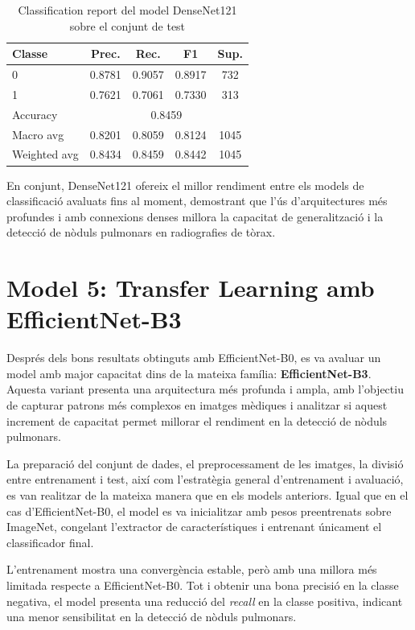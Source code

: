 \documentclass[conference]{IEEEtran}
\begin{document}
\begin{table}[H]
\caption{Classification report del model DenseNet121 sobre el conjunt de test}
\label{tab:classification_report_densenet}
\centering
\footnotesize
\setlength{\tabcolsep}{3pt}
\begin{tabular}{lcccc}
\toprule
\textbf{Classe} & \textbf{Prec.} & \textbf{Rec.} & \textbf{F1} & \textbf{Sup.} \\
\midrule
0 & 0.8781 & 0.9057 & 0.8917 & 732 \\
1 & 0.7621 & 0.7061 & 0.7330 & 313 \\
\midrule
Accuracy     & \multicolumn{4}{c}{0.8459} \\
Macro avg    & 0.8201 & 0.8059 & 0.8124 & 1045 \\
Weighted avg & 0.8434 & 0.8459 & 0.8442 & 1045 \\
\bottomrule
\end{tabular}
\end{table}

En conjunt, DenseNet121 ofereix el millor rendiment entre els models de
classificació avaluats fins al moment, demostrant que l’ús d’arquitectures més
profundes i amb connexions denses millora la capacitat de generalització i la
detecció de nòduls pulmonars en radiografies de tòrax.


\section{Model 5: Transfer Learning amb EfficientNet-B3}

Després dels bons resultats obtinguts amb EfficientNet-B0, es va avaluar un model amb
major capacitat dins de la mateixa família: \textbf{EfficientNet-B3}. Aquesta variant
presenta una arquitectura més profunda i ampla, amb l’objectiu de capturar patrons
més complexos en imatges mèdiques i analitzar si aquest increment de capacitat
permet millorar el rendiment en la detecció de nòduls pulmonars.

La preparació del conjunt de dades, el preprocessament de les imatges, la divisió
entre entrenament i test, així com l’estratègia general d’entrenament i avaluació, es
van realitzar de la mateixa manera que en els models anteriors. Igual que en el cas
d’EfficientNet-B0, el model es va inicialitzar amb pesos preentrenats sobre ImageNet,
congelant l’extractor de característiques i entrenant únicament el classificador final.

L’entrenament mostra una convergència estable, però amb una millora més limitada
respecte a EfficientNet-B0. Tot i obtenir una bona precisió en la classe negativa, el
model presenta una reducció del \textit{recall} en la classe positiva, indicant una menor
sensibilitat en la detecció de nòduls pulmonars.
\end{document}
